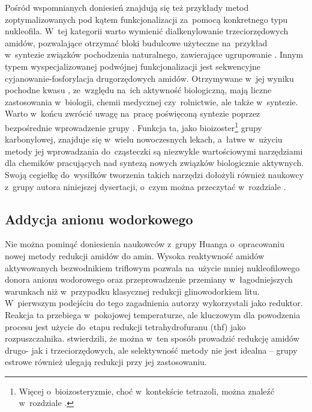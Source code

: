 Pośród wspomnianych doniesień znajdują się też przykłady metod zoptymalizowanych pod kątem
  funkcjonalizacji za~pomocą konkretnego typu nukleofila.
W~tej kategorii warto wymienić dialkenylowanie trzeciorzędowych amidów,
  pozwalające otrzymać bloki budulcowe użyteczne na~przykład w~syntezie związków pochodzenia naturalnego,
  zawierające ugrupowanie .
Innym typem wyspecjalizowanej podwójnej funkcjonalizacji jest sekwencyjne cyjanowanie-fosforylacja
  drugorzędowych amidów.
Otrzymywane w~jej wyniku pochodne kwasu , ze~względu na~ich aktywność biologiczną,
  mają liczne zastosowania w~biologii, chemii medycznej czy~rolnictwie, ale także w~syntezie.
Warto w~końcu zwrócić uwagę na~pracę poświęconą syntezie 
  poprzez bezpośrednie wprowadzenie grupy .
Funkcja ta, jako bioizoster\footnote{%
    Więcej o~bioizosteryzmie, choć w~kontekście tetrazoli, można znaleźć w~rozdziale .%
  } grupy karbonylowej, znajduje się w~wielu nowoczesnych lekach,
  a~łatwe w~użyciu metody jej wprowadzania do~cząsteczki są niezwykle wartościowymi narzędziami
  dla chemików pracujących nad syntezą nowych związków biologicznie aktywnych.
Swoją cegiełkę do~wysiłków tworzenia takich narzędzi dołożyli również naukowcy z~grupy autora niniejszej dysertacji,
  o~czym można przeczytać w~rozdziale .

\subsection{Addycja anionu wodorkowego}\label{literature:triflic:reduction}
Nie można pominąć doniesienia naukowców z~grupy Huanga o~opracowaniu nowej metody redukcji amidów do amin.
Wysoka reaktywność amidów aktywowanych bezwodnikiem triflowym pozwala na~użycie mniej nukleofilowego donora anionu wodorowego oraz
przeprowadzenie przemiany w~łagodniejszych warunkach niż w~przypadku klasycznej redukcji glinowodorkiem litu.
W~pierwszym podejściu do tego zagadnienia autorzy wykorzystali  jako reduktor.
Reakcja ta przebiega w~pokojowej temperaturze, ale
  kluczowym dla powodzenia procesu jest użycie do~etapu redukcji tetrahydrofuranu (\acrshort{thf}) jako rozpuszczalnika.
\citeauthor{xiang10} stwierdzili, że można w~ten sposób prowadzić redukcję amidów drugo- jak i trzeciorzędowych,
  ale selektywność metody nie jest idealna \--- grupy estrowe również ulegają redukcji przy jej zastosowaniu.

